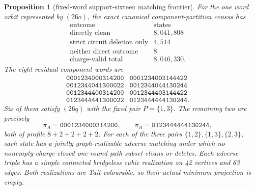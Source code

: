 \documentclass[11pt]{article}
\newtheorem{proposition}[theorem]{Proposition}
\theoremstyle{definition}
\theoremstyle{remark}
\begin{document}
\begin{proposition}[fixed-word support-sixteen matching frontier]
\label{prop:supportsixteenfixedword}
For the one word orbit represented by \((26o)\), the exact canonical
component-partition census has
\[
\begin{array}{c|r}
\text{outcome}&\text{states}\\ \hline
\text{directly clean}&8{,}041{,}808\\
\text{strict circuit deletion only}&4{,}514\\
\text{neither direct outcome}&8\\ \hline
\text{charge-valid total}&8{,}046{,}330 .
\end{array}                                                \tag{26r}
\]
The eight residual component words are
\[
\begin{array}{ll}
\texttt{0001234000314200}&\texttt{0001234003144422}\\
\texttt{0012344041300022}&\texttt{0012344044130244}\\
\texttt{0012344400314200}&\texttt{0012344403144422}\\
\texttt{0123444441300022}&\texttt{0123444444130244}.
\end{array}                                                \tag{26s}
\]
Six of them satisfy \((26q)\) with the fixed pair \(P=\{1,3\}\).
The remaining two are precisely
\[
 \pi_A=\texttt{0001234000314200},\qquad
 \pi_B=\texttt{0123444444130244},                          \tag{26t}
\]
both of profile \(8+2+2+2+2\).  For each of the three pairs
\(\{1,2\},\{1,3\},\{2,3\}\), each state has a jointly graph-realizable
adverse matching under which no nonempty charge-closed one-round path
subset cleans or deletes.  Each adverse triple has a simple connected
bridgeless cubic realization on 42 vertices and 63 edges.
Both realizations are Tait-colourable, so their actual minimum projection
is empty.
\end{proposition}
\end{document}
